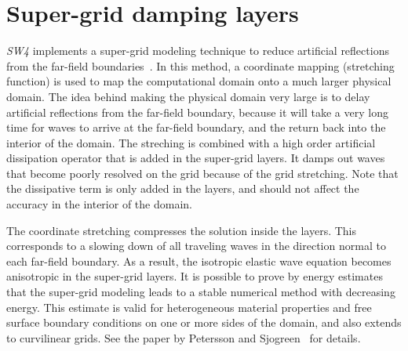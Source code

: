 \documentclass[11pt]{report}
\begin{document}
\section{Super-grid damping layers}

\emph{SW4} implements a super-grid modeling technique to reduce artificial reflections from the
far-field boundaries~\cite{AppCol-09, PetSjo-13}. In this method, a coordinate mapping (stretching
function) is used to map the computational domain onto a much larger physical domain. The idea
behind making the physical domain very large is to delay artificial reflections from the far-field
boundary, because it will take a very long time for waves to arrive at the far-field boundary,
and the return back into the interior of the domain. The streching is combined with a high order
artificial dissipation operator that is added in the super-grid layers. It damps out waves that
become poorly resolved on the grid because of the grid stretching. Note that the dissipative term is
only added in the layers, and should not affect the accuracy in the interior of the domain.

The coordinate stretching compresses the solution inside the layers. This corresponds to a slowing
down of all traveling waves in the direction normal to each far-field boundary. As a result, the
isotropic elastic wave equation becomes anisotropic in the super-grid layers. It is possible to
prove by energy estimates that the super-grid modeling leads to a stable numerical method with
decreasing energy. This estimate is valid for heterogeneous material properties and free surface
boundary conditions on one or more sides of the domain, and also extends to curvilinear grids. See
the paper by Petersson and Sjogreen~\cite{PetSjo-13} for details.
\end{document}
